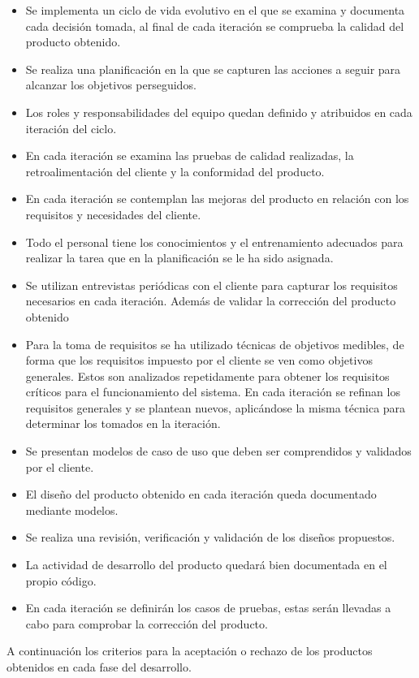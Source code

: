 \begin{itemize}
\item Se implementa un ciclo de vida evolutivo en el que se examina y documenta cada decisión tomada, al final de cada iteración se comprueba la calidad del producto obtenido.
\item Se realiza una planificación en la que se capturen las acciones a seguir para alcanzar los objetivos perseguidos.
\item Los roles y responsabilidades del equipo quedan definido y atribuidos en cada iteración del ciclo.
\item En cada iteración se examina las pruebas de calidad realizadas, la retroalimentación del cliente y la conformidad del producto.  
\item En cada iteración se contemplan las mejoras del producto en relación con los requisitos y necesidades del cliente.
\item Todo el personal tiene los conocimientos y el entrenamiento adecuados para realizar la tarea que en la planificación se le ha sido asignada.
\item Se utilizan entrevistas periódicas con el cliente para capturar los requisitos necesarios en cada iteración. Además de validar la corrección del producto obtenido
\item Para la toma de requisitos se ha utilizado técnicas de objetivos medibles, de forma que los requisitos impuesto por el cliente se ven como objetivos generales. 
Estos son analizados repetidamente para obtener los requisitos críticos para el funcionamiento del sistema. En cada iteración se refinan los requisitos generales y se plantean 
nuevos, aplicándose la misma técnica para determinar los tomados en la iteración. 
\item Se presentan modelos de caso de uso que deben ser comprendidos y validados por el cliente. 
\item El diseño del producto obtenido en cada iteración queda documentado mediante modelos.
\item Se realiza una revisión, verificación y validación de los diseños propuestos.
\item La actividad de desarrollo del producto quedará bien documentada en el propio código. 
\item En cada iteración se definirán los casos de pruebas, estas serán llevadas a cabo para comprobar la corrección del producto.
\end{itemize}

A continuación los criterios para la aceptación o rechazo de los productos obtenidos en cada fase del desarrollo.\\

